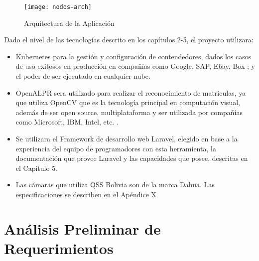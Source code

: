         \begin{figure}[H]
            \centering
            \texttt{[image: nodos-arch]}
            \caption{Arquitectura de la Aplicación}
            \label{fig:nodos-arch}
        \end{figure} 
        
        Dado el nivel de las tecnologías descrito en los capítulos 2-5, el proyecto utilizara:
        \begin{itemize}
            \item Kubernetes para la gestión y configuración de contendedores, dados los casos de uso exitosos en producción en compañías como Google, SAP, Ebay, Box \parencite{Kubernetes2016-ub}; y el poder de ser ejecutado en cualquier nube.
            \item OpenALPR sera utilizado para realizar el reconocimiento de matriculas, ya que utiliza OpenCV que es la tecnología principal en computación visual, además de ser open source, multiplataforma y ser utilizada por compañías como Microsoft, IBM, Intel, etc. \parencite{Itseez2000-he}.
            \item Se utilizara el Framework de desarrollo web Laravel, elegido en base a la experiencia del equipo de programadores con esta herramienta, la documentación que provee Laravel y las capacidades que posee, descritas en el Capitulo 5.
            \item Las cámaras que utiliza QSS Bolivia son de la marca Dahua. Las especificaciones se describen en el  Apéndice X
        \end{itemize}

    \section{Análisis Preliminar de Requerimientos}
